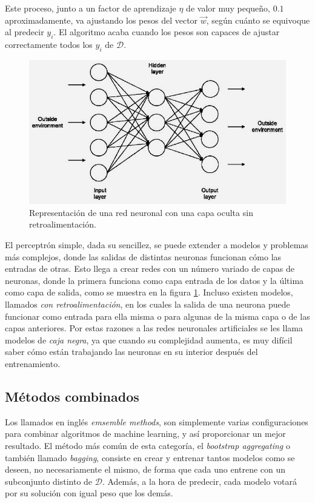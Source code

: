 Este proceso, junto a un factor de aprendizaje $\eta$ de valor muy pequeño, $0.1$ aproximadamente, va ajustando los pesos del vector $\vec{w}$, según cuánto se equivoque al predecir $y_{i}$. El algoritmo acaba cuando los pesos son capaces de ajustar correctamente todos los $y_{i}$ de $\mathcal{D}$.

\begin{figure}[ht]
  \centering
  \includegraphics[width=120mm]{figures/ch_03/neural_network_example.jpg}
  \caption{Representación de una red neuronal con una capa oculta sin retroalimentación. \cite{manzi2013from}}
  \label{fig:3.5}
\end{figure}

El perceptrón simple, dada su sencillez, se puede extender a modelos y problemas más complejos, donde las salidas de distintas neuronas funcionan cómo las entradas de otras. Esto llega a crear redes con un número variado de capas de neuronas, donde la primera funciona como capa entrada de los datos y la última como capa de salida, como se muestra en la figura \ref{fig:3.5}. Incluso existen modelos, llamados \emph{con retroalimentación}, en los cuales la salida de una neurona puede funcionar como entrada para ella misma o para algunas de la misma capa o de las capas anteriores. Por estas razones a las redes neuronales artificiales se les llama modelos de \emph{caja negra}, ya que cuando su complejidad aumenta, es muy difícil saber cómo están trabajando las neuronas en su interior después del entrenamiento.

\subsection{Métodos combinados} \label{subsec:3.1.4}

Los llamados en inglés \emph{emsemble methods}, son simplemente varias configuraciones para combinar algoritmos de machine learning, y así proporcionar un mejor resultado. El método más común de esta categoría, el \emph{bootstrap aggregating} o también llamado \emph{bagging}, consiste en crear y entrenar tantos modelos como se deseen, no necesariamente el mismo, de forma que cada uno entrene con un subconjunto distinto de $\mathcal{D}$. Además, a la hora de predecir, cada modelo votará por su solución con igual peso que los demás.

